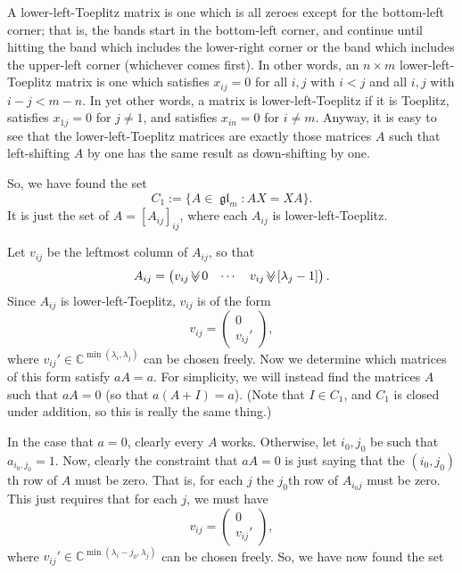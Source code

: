 \documentclass[12pt,psamsfonts]{article}
\newcommand{\downshift}{\mathbin{\rotatebox[origin=c]{90}{$\ll$}}}
\DeclareMathOperator{\gl}{\mathfrak{gl}}
\begin{document}
A lower-left-Toeplitz matrix is one which is all zeroes except for the bottom-left corner; that is, the bands start in the bottom-left corner, and continue until hitting the band which includes the lower-right corner or the band which includes the upper-left corner (whichever comes first).
In other words, an \(n \times m\) lower-left-Toeplitz matrix is one which satisfies \(x_{ij} = 0\) for all \(i,j\) with \(i < j\) and all \(i,j\) with \(i - j < m - n\).
In yet other words, a matrix is lower-left-Toeplitz if it is Toeplitz, satisfies \(x_{1j} = 0\) for \(j \neq 1\), and satisfies \(x_{in} = 0\) for \(i \neq m\).
Anyway, it is easy to see that the lower-left-Toeplitz matrices are exactly those matrices \(A\) such that left-shifting \(A\) by one has the same result as down-shifting by one.
\par So, we have found the set 
\[C_1 := \{A \in \gl_m : AX = XA\}.\]
It is just the set of \(A = [A_{ij}]_{ij}\), where each \(A_{ij}\) is lower-left-Toeplitz.
\par Let \(v_{ij}\) be the leftmost column of \(A_{ij}\), so that
\[A_{ij} = \begin{pmatrix}
    v_{ij} \downshift 0 & \cdots & v_{ij} \downshift [\lambda_j - 1]
\end{pmatrix}.\]
Since \(A_{ij}\) is lower-left-Toeplitz, \(v_{ij}\) is of the form 
\[v_{ij} = \begin{pmatrix}
    0\\
    v_{ij}'
\end{pmatrix},\]
where \(v_{ij}' \in \mathbb{C}^{\min(\lambda_i, \lambda_j)}\) can be chosen freely.
Now we determine which matrices of this form satisfy \(aA = a\).
For simplicity, we will instead find the matrices \(A\) such that \(aA = 0\) (so that \(a(A + I) = a\)).
(Note that \(I \in C_1\), and \(C_1\) is closed under addition, so this is really the same thing.)
\par In the case that \(a = 0\), clearly every \(A\) works.
Otherwise, let \(i_0, j_0\) be such that \(a_{i_0,j_0} = 1\).
Now, clearly the constraint that \(aA = 0\) is just saying that the \((i_0,j_0)\)th row of \(A\) must be zero.
That is, for each \(j\) the \(j_0\)th row of \(A_{i_0j}\) must be zero.
This just requires that for each \(j\), we must have 
\[v_{ij} = \begin{pmatrix}
    0\\
    v_{ij}'
\end{pmatrix},\]
where \(v_{ij}' \in \mathbb{C}^{\min(\lambda_i - j_0, \lambda_j)}\) can be chosen freely.
So, we have now found the set 
\end{document}
